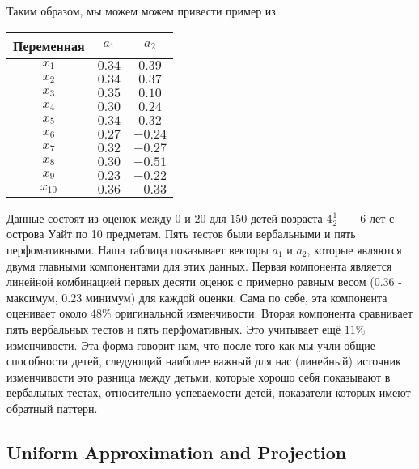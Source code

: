 \subsubsection{}
Таким образом, мы можем можем привести пример из \cite{pca}

\begin{center}
\begin{tabular}{ |c|c|c| } 
 \hline
 Переменная & $a_1$ & $a_2$ \\ 
 \hline \hline
 $x_1$ & $0.34$ & $0.39$ \\ 
 \hline
 $x_2$ & $0.34$ & $0.37$ \\ 
 \hline
 $x_3$ & $0.35$ & $0.10$ \\ 
 \hline
 $x_4$ & $0.30$ & $0.24$ \\ 
 \hline
 $x_5$ & $0.34$ & $0.32$ \\ 
 \hline
 $x_6$ & $0.27$ & $-0.24$ \\ 
 \hline
 $x_7$ & $0.32$ & $-0.27$ \\ 
 \hline
 $x_8$ & $0.30$ & $-0.51$ \\ 
 \hline
 $x_9$ & $0.23$ & $-0.22$ \\ 
 \hline
 $x_10$ & $0.36$ & $-0.33$ \\ 
 \hline
\end{tabular}
\end{center}

Данные состоят из оценок между $0$ и $20$ для $150$ детей возраста $4 \frac{1}{2} -- 6$ лет с острова Уайт по 10 предметам. 
Пять тестов были вербальными и пять перфомативными. Наша таблица показывает векторы $a_1$ и $a_2$, которые являются двумя главными компонентами для этих данных. 
Первая компонента является линейной комбинацией первых десяти оценок с примерно равным весом ($0.36$ - максимум, $0.23$ минимум) для каждой оценки. 
Сама по себе, эта компонента оценивает около $48\%$ оригинальной изменчивости. Вторая компонента сравнивает пять вербальных тестов и пять перфомативных. 
Это учитывает ещё $11\%$ изменчивости. 
Эта форма говорит нам, что после того как мы учли общие способности детей, следующий наиболее важный для нас (линейный) источник изменчивости это разница между детьми, которые хорошо себя показывают в вербальных тестах, относительно успеваемости детей, показатели которых имеют обратный паттерн.
\newpage
\subsection{Uniform Approximation and Projection}

